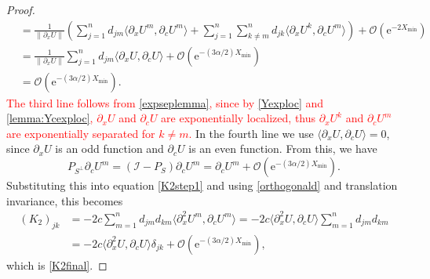 \documentclass[review,onefignum,onetabnum]{siamart171218}
\newcommand{\rme}{\mathrm{e}}
\newcommand{\calI}{\mathcal{I}}
\newcommand{\vK}{\bm{\mathit{K}}}
\newcommand{\revised}[1]{ \textcolor{red}{#1} }
\begin{document}
\begin{proof}
\[\begin{aligned}
&= \frac{1}{\|\partial_x U\|} \left( \sum_{j=1}^n d_{jm} \langle \partial_x U^m, \partial_c U^m \rangle + \sum_{j=1}^n \sum_{k \neq m}^n d_{jk} \langle \partial_x U^k, \partial_c U^m \rangle \right) + \mathcal{O}(\rme^{-2 X_{\mathrm{min}}}) \\
&= \frac{1}{\|\partial_x U\|} \sum_{j=1}^n d_{jm} \langle \partial_x U, \partial_c U \rangle + \mathcal{O}(\rme^{-(3 \alpha/2) X_{\mathrm{min}}}) \\
&= \mathcal{O}(\rme^{-(3 \alpha/2) X_{\mathrm{min}}}).
\end{aligned}
\]
\revised{
The third line follows from \cref{expseplemma}, since by \cref{Yexploc} and \cref{lemma:Ycexploc}, $\partial_x U$ and $\partial_c U$ are exponentially localized, thus $\partial_x U^k$ and $\partial_c U^m$ are exponentially separated for $k \neq m$.
}
In the fourth line we use $\langle \partial_x U, \partial_c U \rangle = 0$, since $\partial_x U$ is an odd function and $\partial_c U$ is an even function. From this, we have
\[
P_{S^\perp} \partial_c U^m = (\calI - P_S) \partial_c U^m = \partial_c U^m + \mathcal{O}(\rme^{-(3 \alpha/2) X_{\mathrm{min}}}).
\]
Substituting this into equation \cref{K2step1} and using \cref{orthogonald} and translation invariance, this becomes
\[
\begin{aligned}
(\vK_2)_{jk}
&= -2 c \sum_{m = 1}^{n} d_{jm} d_{km} \langle \partial_x^2U^m, \partial_cU^m \rangle
= -2 c \langle \partial_x^2U, \partial_cU \rangle \sum_{m = 1}^{n} d_{jm} d_{km} \\
&= -2 c \langle \partial_x^2U,\partial_cU \rangle \delta_{jk} + \mathcal{O}(\rme^{-(3 \alpha/2) X_{\mathrm{min}}}),
\end{aligned}
\]
which is \cref{K2final}.
\end{proof}
\end{document}
